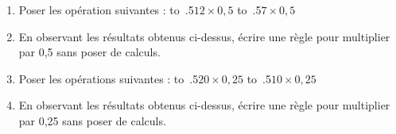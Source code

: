 \documentclass[activite]{thedocument}
\begin{document}
    \begin{enumerate}
        \item Poser les opération suivantes :\vskip10pt
        \hskip0pt\hbox{\hbox to .5$12\times0,5$}\vskip5pt
        \hskip0pt\hbox{\hbox to .5$7\times0,5$}
        \item En observant les résultats obtenus ci-dessus, écrire une règle
        pour multiplier par 0,5 sans poser de calculs.
        \dotedline
        \item Poser les opérations suivantes :\vskip10pt
        \hskip0pt\hbox{\hbox to .5$20\times0,25$}\vskip5pt
        \hskip0pt\hbox{\hbox to .5$10\times0,25$}
        \item En observant les résultats obtenus ci-dessus, écrire une règle
        pour multiplier par 0,25 sans poser de calculs.
        \dotedline
    \end{enumerate}
\end{document}
